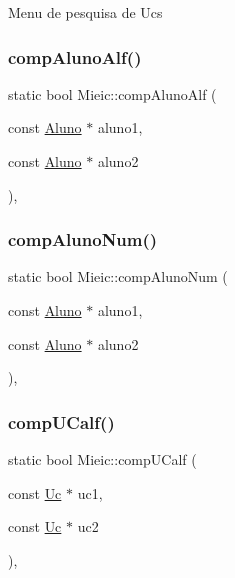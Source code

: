 Menu de pesquisa de Ucs \hypertarget{class_mieic_a1ce5f95cf69f36daaf22320cc9d64ffb}{}\label{class_mieic_a1ce5f95cf69f36daaf22320cc9d64ffb} 
\subsubsection{\texorpdfstring{comp\+Aluno\+Alf()}{compAlunoAlf()}}
{\footnotesize\ttfamily static bool Mieic\+::comp\+Aluno\+Alf (\begin{DoxyParamCaption}\item[{const \hyperlink{class_aluno}{Aluno} $\ast$}]{aluno1,  }\item[{const \hyperlink{class_aluno}{Aluno} $\ast$}]{aluno2 }\end{DoxyParamCaption})\hspace{0.3cm}{\ttfamily [inline]}, {\ttfamily [static]}}

\hypertarget{class_mieic_a284e1568bcfd6993ac8fe88f40a6c545}{}\label{class_mieic_a284e1568bcfd6993ac8fe88f40a6c545} 
\subsubsection{\texorpdfstring{comp\+Aluno\+Num()}{compAlunoNum()}}
{\footnotesize\ttfamily static bool Mieic\+::comp\+Aluno\+Num (\begin{DoxyParamCaption}\item[{const \hyperlink{class_aluno}{Aluno} $\ast$}]{aluno1,  }\item[{const \hyperlink{class_aluno}{Aluno} $\ast$}]{aluno2 }\end{DoxyParamCaption})\hspace{0.3cm}{\ttfamily [inline]}, {\ttfamily [static]}}

\hypertarget{class_mieic_a86b5216f30fe64974fc61cd2dd240169}{}\label{class_mieic_a86b5216f30fe64974fc61cd2dd240169} 
\subsubsection{\texorpdfstring{comp\+U\+Calf()}{compUCalf()}}
{\footnotesize\ttfamily static bool Mieic\+::comp\+U\+Calf (\begin{DoxyParamCaption}\item[{const \hyperlink{class_uc}{Uc} $\ast$}]{uc1,  }\item[{const \hyperlink{class_uc}{Uc} $\ast$}]{uc2 }\end{DoxyParamCaption})\hspace{0.3cm}{\ttfamily [inline]}, {\ttfamily [static]}}

